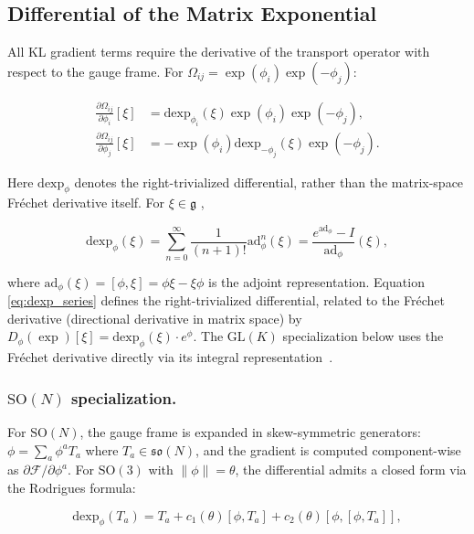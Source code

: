 \documentclass[twoside,11pt]{article}
\begin{document}
\subsection{Differential of the Matrix Exponential}

All KL gradient terms require the derivative of the transport operator with respect to the gauge frame. For $\Omega_{ij} = \exp(\phi_i)\exp(-\phi_j)$:

\begin{align}
\frac{\partial \Omega_{ij}}{\partial \phi_i}[\xi]
&= \mathrm{dexp}_{\phi_i}(\xi)\exp(\phi_i)\exp(-\phi_j), \label{eq:dOmega_dphi_i}\\
\frac{\partial \Omega_{ij}}{\partial \phi_j}[\xi]
&= -\exp(\phi_i)\mathrm{dexp}_{-\phi_j}(\xi)\exp(-\phi_j). \label{eq:dOmega_dphi_j}
\end{align}

Here $\mathrm{dexp}_{\phi}$ denotes the right-trivialized differential, rather than the matrix-space Fr\'echet derivative itself. For $\xi\in\mathfrak g$ \citep{Gallier2020,Hall2015},

\begin{equation}
\mathrm{dexp}_\phi(\xi) = \sum_{n=0}^{\infty} \frac{1}{(n+1)!} \mathrm{ad}_\phi^n(\xi) = \frac{e^{\mathrm{ad}_\phi} - I}{\mathrm{ad}_\phi}(\xi),
\label{eq:dexp_series}
\end{equation}

where $\mathrm{ad}_\phi(\xi) = [\phi, \xi] = \phi\xi - \xi\phi$ is the adjoint representation. Equation \eqref{eq:dexp_series} defines the right-trivialized differential, related to the Fr\'{e}chet derivative (directional derivative in matrix space) by $D_\phi(\exp)[\xi] = \mathrm{dexp}_\phi(\xi) \cdot e^\phi$. The $\mathrm{GL}(K)$ specialization below uses the Fr\'{e}chet derivative directly via its integral representation~\citep[Ch.~10]{Higham2008}.

\subsubsection{$\mathrm{SO}(N)$ specialization.}

For $\mathrm{SO}(N)$, the gauge frame is expanded in skew-symmetric generators: $\phi = \sum_a \phi^a T_a$ where $T_a \in \mathfrak{so}(N)$, and the gradient is computed component-wise as $\partial \mathcal{F}/\partial \phi^a$. For $\mathrm{SO}(3)$ with $\|\phi\| = \theta$, the differential admits a closed form via the Rodrigues formula:

\begin{equation}
\mathrm{dexp}_\phi(T_a) = T_a + c_1(\theta)[\phi, T_a] + c_2(\theta)[\phi, [\phi, T_a]],
\label{eq:dexp_so3}
\end{equation}
\end{document}
